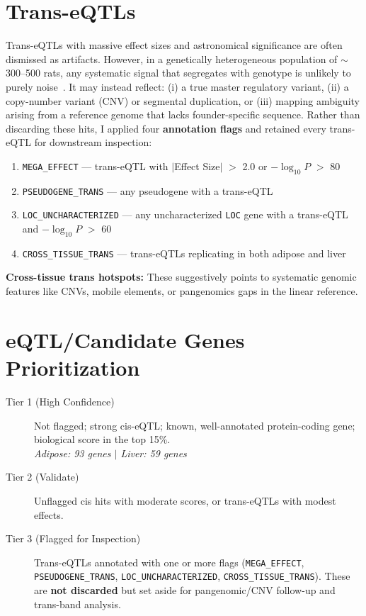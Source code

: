 \documentclass[11pt,a4paper]{article}
\begin{document}
\section{Trans-eQTLs} 

Trans-eQTLs with massive effect sizes and astronomical significance are often dismissed as artifacts. However, in a genetically heterogeneous population of $\sim$300--500 rats, any systematic signal that segregates with genotype is unlikely to purely noise~\cite{vosa2021}. It may instead reflect: (i) a true master regulatory variant, (ii) a copy-number variant (CNV) or segmental duplication, or (iii) mapping ambiguity arising from a reference genome that lacks founder-specific sequence. Rather than discarding these hits, I applied four \textbf{annotation flags} and retained every trans-eQTL for downstream inspection:
\begin{enumerate}
    \item \texttt{MEGA\_EFFECT} — trans-eQTL with $|$Effect Size$|$ $>$ 2.0 or $-\log_{10}P$ $>$ 80
    \item \texttt{PSEUDOGENE\_TRANS} — any pseudogene with a trans-eQTL
    \item \texttt{LOC\_UNCHARACTERIZED} — any uncharacterized \texttt{LOC} gene with a trans-eQTL and $-\log_{10}P$ $>$ 60
    \item \texttt{CROSS\_TISSUE\_TRANS} — trans-eQTLs replicating in both adipose and liver
\end{enumerate}

\noindent\textbf{Cross-tissue trans hotspots:} These suggestively points to systematic genomic features like CNVs, mobile elements, or pangenomics gaps in the linear reference. 


\section{eQTL/Candidate Genes Prioritization}

\begin{description}
    \item[Tier 1 (High Confidence)] Not flagged; strong cis-eQTL; known, well-annotated protein-coding gene; biological score in the top 15\%.\\
    \textit{Adipose: 93 genes $|$ Liver: 59 genes}
    
    \item[Tier 2 (Validate)] Unflagged cis hits with moderate scores, or trans-eQTLs with modest effects.
    
    \item[Tier 3 (Flagged for Inspection)] Trans-eQTLs annotated with one or more flags (\texttt{MEGA\_EFFECT}, \texttt{PSEUDOGENE\_TRANS}, \texttt{LOC\_UNCHARACTERIZED}, \texttt{CROSS\_TISSUE\_TRANS}). These are \textbf{not discarded} but set aside for pangenomic/CNV follow-up and trans-band analysis.
\end{description}
\end{document}
